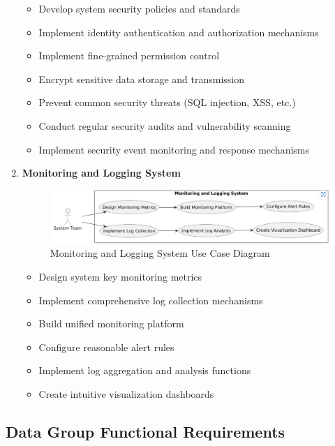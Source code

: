 \documentclass[a4paper,12pt]{article}
\begin{document}
\begin{enumerate}
  \begin{itemize}
    \item Develop system security policies and standards
    \item Implement identity authentication and authorization mechanisms
    \item Implement fine-grained permission control
    \item Encrypt sensitive data storage and transmission
    \item Prevent common security threats (SQL injection, XSS, etc.)
    \item Conduct regular security audits and vulnerability scanning
    \item Implement security event monitoring and response mechanisms
  \end{itemize}
  
  \item \textbf{Monitoring and Logging System}
  
  \begin{figure}[H]
    \centering
    \includegraphics[width=0.75\linewidth]{assets/image7_EG.png}
    \caption{Monitoring and Logging System Use Case Diagram}
    \label{fig:monitoring-logging}
  \end{figure}
  
  \begin{itemize}
    \item Design system key monitoring metrics
    \item Implement comprehensive log collection mechanisms
    \item Build unified monitoring platform
    \item Configure reasonable alert rules
    \item Implement log aggregation and analysis functions
    \item Create intuitive visualization dashboards
  \end{itemize}
\end{enumerate}

\subsection{Data Group Functional Requirements}
\end{document}
